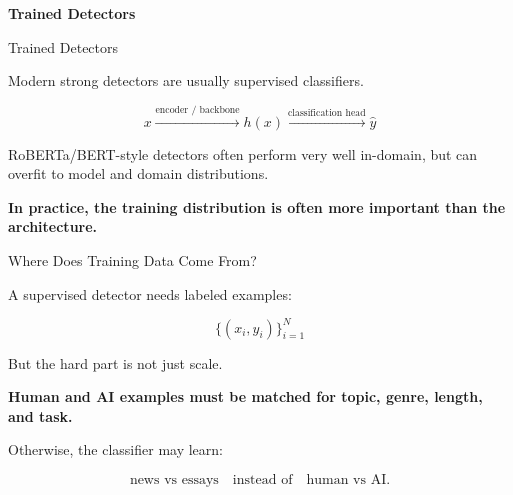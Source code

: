 \documentclass[11pt,compress,t,notes=noshow, xcolor=table]{beamer}
\begin{document}
\begin{frame}[plain]
\vfill
\begin{center}
{\LARGE \textbf{Trained Detectors}}
\end{center}
\vfill
\end{frame}

\begin{vbframe}{Trained Detectors}

Modern strong detectors are usually supervised classifiers.

\[
x
\xrightarrow{\text{encoder / backbone}}
h(x)
\xrightarrow{\text{classification head}}
\hat y
\]

RoBERTa/BERT-style detectors often perform very well in-domain, but can overfit to model and domain distributions.

\begin{center}
\textbf{In practice, the training distribution is often more important than the architecture.}
\end{center}


\end{vbframe}

\begin{vbframe}{Where Does Training Data Come From?}

A supervised detector needs labeled examples:

\[
\{(x_i,y_i)\}_{i=1}^{N}
\]

But the hard part is not just scale.

\begin{center}
\textbf{Human and AI examples must be matched for topic, genre, length, and task.}
\end{center}

Otherwise, the classifier may learn:

\[
\text{news vs essays}
\quad\text{instead of}\quad
\text{human vs AI}.
\]

\end{vbframe}
\end{document}

